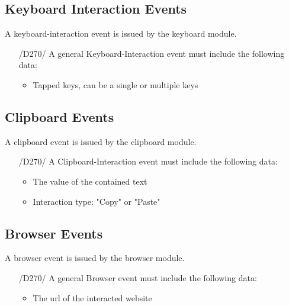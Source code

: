 \subsection{Keyboard Interaction Events}

A keyboard-interaction event is issued by the keyboard module.

\begin{itemize}
\item[/D270/] A general Keyboard-Interaction event must include the following data:
	\begin{itemize}
	\item Tapped keys, can be a single or multiple keys
	\end{itemize}
\end{itemize}

\subsection{Clipboard Events}

A clipboard event is issued by the clipboard module.

\begin{itemize}
\item[/D270/] A Clipboard-Interaction event must include the following data:
	\begin{itemize}
	\item The value of the contained text
	\item Interaction type: "Copy" or "Paste"
	\end{itemize}
\end{itemize}

\subsection{Browser Events}

A browser event is issued by the browser module.

\begin{itemize}
\item[/D270/] A general Browser event must include the following data:
	\begin{itemize}
	\item The url of the interacted website
	\end{itemize}
\end{itemize}